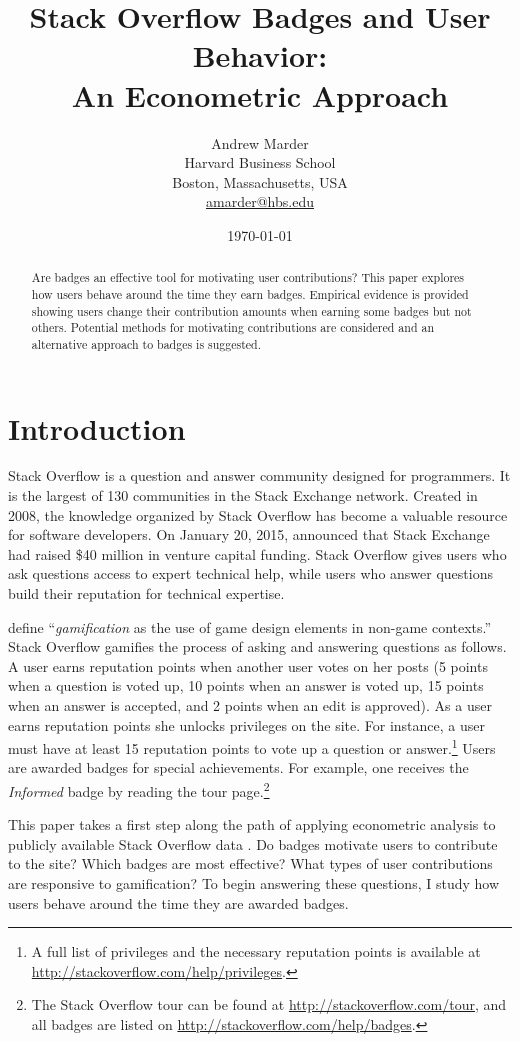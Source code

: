 \documentclass[conference]{IEEEtran}
\title{
  Stack Overflow Badges and User Behavior: \\
  An Econometric Approach
}
\author{
  Andrew Marder \\
  Harvard Business School \\
  Boston, Massachusetts, USA \\
  \href{mailto:amarder@hbs.edu}{amarder@hbs.edu}
}
\date{\today}
\newcommand{\1}{\mathds{1}}
\begin{document}
\maketitle

\begin{abstract}
Are badges an effective tool for motivating user contributions? This paper explores how users behave around the time they earn badges. Empirical evidence is provided showing users change their contribution amounts when earning some badges but not others. Potential methods for motivating contributions are considered and an alternative approach to badges is suggested.
\end{abstract}

\section{Introduction}

Stack Overflow is a question and answer community designed for programmers. It is the largest of 130 communities in the Stack Exchange network. Created in 2008, the knowledge organized by Stack Overflow has become a valuable resource for software developers. On January 20, 2015, \citet{Spoelsky2015} announced that Stack Exchange had raised \$40 million in venture capital funding. Stack Overflow gives users who ask questions access to expert technical help, while users who answer questions build their reputation for technical expertise.

\citet{Deterding2011} define ``\textit{gamification} as the use of game design elements in non-game contexts.'' Stack Overflow gamifies the process of asking and answering questions as follows. A user earns reputation points when another user votes on her posts (5 points when a question is voted up, 10 points when an answer is voted up, 15 points when an answer is accepted, and 2 points when an edit is approved). As a user earns reputation points she unlocks privileges on the site. For instance, a user must have at least 15 reputation points to vote up a question or answer.\footnote{A full list of privileges and the necessary reputation points is available at \url{http://stackoverflow.com/help/privileges}.} Users are awarded badges for special achievements. For example, one receives the \textit{Informed} badge by reading the tour page.\footnote{The Stack Overflow tour can be found at \url{http://stackoverflow.com/tour}, and all badges are listed on \url{http://stackoverflow.com/help/badges}.}

This paper takes a first step along the path of applying econometric analysis to publicly available Stack Overflow data \cite{se-dump}. Do badges motivate users to contribute to the site? Which badges are most effective? What types of user contributions are responsive to gamification? To begin answering these questions, I study how users behave around the time they are awarded badges.
\end{document}
